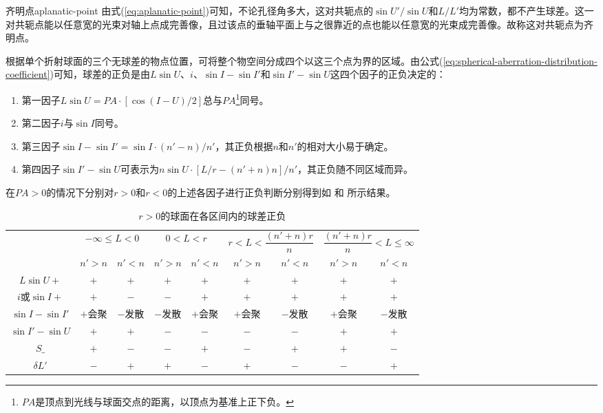 \documentclass[cn,10pt,chinesefont=founder,math=newtx,cite=super,twoside]{elegantbook}
\begin{document}
\begin{definition}{齐明点}{aplanatic-point}
	由式(\ref{eq:aplanatic-point})可知，不论孔径角多大，这对共轭点的$\sin U'/\sin U$和$L/L'$均为常数，都不产生球差。这一对共轭点能以任意宽的光束对轴上点成完善像，且过该点的垂轴平面上与之很靠近的点也能以任意宽的光束成完善像。故称这对共轭点为齐明点。
\end{definition}

根据单个折射球面的三个无球差的物点位置，可将整个物空间分成四个以这三个点为界的区域。由公式(\ref{eq:spherical-aberration-distribution-coefficient})可知，球差的正负是由$L\sin U$、$i$、$\sin I-\sin I'$和$\sin I'-\sin U$这四个因子的正负决定的：
\begin{enumerate}
	\item 第一因子$L\sin U=PA\cdot[\cos(I-U)/2]$总与$PA$\footnote{$PA$是顶点到光线与球面交点的距离，以顶点为基准上正下负。}同号。
	\item 第二因子$i$与$\sin I$同号。
	\item 第三因子$\sin I-\sin I'=\sin I\cdot(n'-n)/n'$，其正负根据$n$和$n'$的相对大小易于确定。
	\item 第四因子$\sin I'-\sin U$可表示为$n\sin U\cdot[L/r-(n'+n)n]/n'$，其正负随不同区域而异。
\end{enumerate}
在$PA>0$的情况下分别对$r>0$和$r<0$的上述各因子进行正负判断分别得到如 和 所示结果。

\begin{table}[htbp]
	\small
	\centering
	\caption{$r>0$的球面在各区间内的球差正负}
	\begin{tabular}{c|c|c|c|c|c|c|c|c}
		\hline
		\multirow{2}{*}{} & \multicolumn{2}{c|}{$-\infty\leqslant L<0$} & \multicolumn{2}{c|}{$0<L<r$} & \multicolumn{2}{c|}{$r<L<\dfrac{(n'+n)r}{n}$} & \multicolumn{2}{c}{$\dfrac{(n'+n)r}{n}<L\leqslant\infty$}\\
		\cline{2-9} 
		& $n'>n$ & $n'<n$ & $n'>n$ & $n'<n$ & $n'>n$ & $n'<n$ & $n'>n$ & $n'<n$\\
		\hline
		$L\sin U+$& $+$ & $+$ & $+$ & $+$ & $+$ & $+$ & $+$ & $+$\\
		\hline
		$i$或$\sin I+$& $+$ & $-$ & $-$ & $+$ & $+$ & $+$ & $+$ & $+$\\
		\hline
		$\sin I-\sin I'$& $+$会聚 & $-$发散 & $-$发散 & $+$会聚 & $+$会聚 & $-$发散 & $+$会聚 & $-$发散\\
		\hline
		$\sin I'-\sin U$& $+$ & $+$ & $-$ & $-$ & $-$ & $-$ & $+$ & $+$\\
		\hline
		$S\_$& $+$ & $-$ & $-$ & $+$ & $-$ & $+$ & $+$ & $-$\\
		\hline
		$\delta L'$& $-$ & $+$ & $+$ & $-$ & $+$ & $-$ & $-$ & $+$\\
		\hline
	\end{tabular}
	\label{tab:spherical-aberration-of-sphere-in-each-interval-1}
\end{table}
\end{document}

